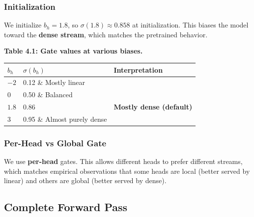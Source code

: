 \subsubsection{Initialization}

We initialize $b_h = 1.8$, so $\sigma(1.8) \approx 0.858$ at initialization. 
This biases the model toward the \textbf{dense stream}, which matches the 
pretrained behavior.

\textbf{Table 4.1: Gate values at various biases.}

\begin{table}[H]
\centering
\small
\begin{tabular}{lll}
\toprule
\textbf{$b_h$} & \textbf{$\sigma(b_h)$} & \textbf{Interpretation} \\
\midrule
$-2$ & 0.12 \& Mostly linear \\
$0$ & 0.50 \& Balanced \\
$1.8$ & 0.86 & \textbf{Mostly dense (default)} \\
$3$ & 0.95 \& Almost purely dense \\
\bottomrule
\end{tabular}
\end{table}

\subsubsection{Per-Head vs Global Gate}

We use \textbf{per-head} gates. This allows different heads to prefer different 
streams, which matches empirical observations that some heads are local 
(better served by linear) and others are global (better served by dense).

\subsection{Complete Forward Pass}

